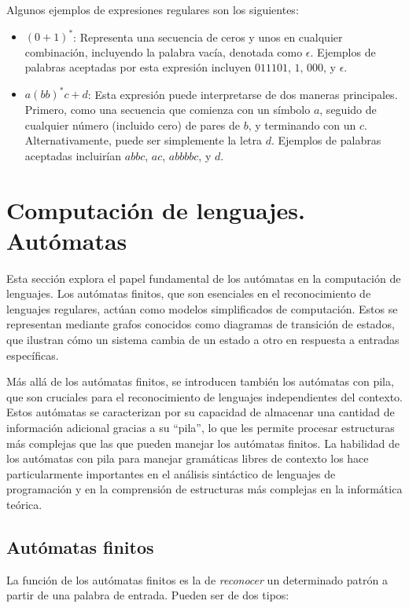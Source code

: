\noindent
Algunos ejemplos de expresiones regulares son los siguientes:
\begin{itemize}
    \item $(0+1)^*$: Representa una secuencia de ceros y unos en cualquier combinación, incluyendo la palabra vacía, denotada como $\epsilon$. Ejemplos de palabras aceptadas por esta expresión incluyen $011101$, $1$, $000$, y $\epsilon$.
    \item $a(bb)^*c+d$: Esta expresión puede interpretarse de dos maneras principales. Primero, como una secuencia que comienza con un símbolo $a$, seguido de cualquier número (incluido cero) de pares de $b$, y terminando con un $c$. Alternativamente, puede ser simplemente la letra $d$. Ejemplos de palabras aceptadas incluirían $abbc$, $ac$, $abbbbc$, y $d$.
\end{itemize}



\section{Computación de lenguajes. Autómatas}\label{section:automat}
Esta sección explora el papel fundamental de los autómatas en la computación de lenguajes. Los autómatas finitos, que son esenciales en el reconocimiento de lenguajes regulares, actúan como modelos simplificados de computación. Estos se representan mediante grafos conocidos como diagramas de transición de estados, que ilustran cómo un sistema cambia de un estado a otro en respuesta a entradas específicas.

Más allá de los autómatas finitos, se introducen también los autómatas con pila, que son cruciales para el reconocimiento de lenguajes independientes del contexto. Estos autómatas se caracterizan por su capacidad de almacenar una cantidad de información adicional gracias a su ``pila'', lo que les permite procesar estructuras más complejas que las que pueden manejar los autómatas finitos. La habilidad de los autómatas con pila para manejar gramáticas libres de contexto los hace particularmente importantes en el análisis sintáctico de lenguajes de programación y en la comprensión de estructuras más complejas en la informática teórica.

\subsection{Autómatas finitos}\label{subsection:AF}
La función de los autómatas finitos es la de \textit{reconocer} un determinado patrón a partir de una palabra de entrada. Pueden ser de dos tipos:


